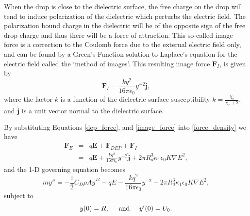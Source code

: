 \documentclass[12pt,a4paper,oneside]{book}
\begin{document}
When the drop is close to the dielectric surface, the free charge on the drop will tend to induce polarization of the dielectric which perturbs the electric field. The polarization bound charge in the dielectric will be of the opposite sign of the free drop charge and thus there will be a force of attraction. This so-called image force is a correction to the Coulomb force due to the external electric field only, and can be found by a Green's Function solution to Laplace's equation for the electric field called the `method of images'\cite{david_j._griffiths_introduction_1999}. This resulting image force $\mathbf{F}_I$, is given by
\begin{equation}
\mathbf{F}_I = \frac{k q^2}{16 \pi \epsilon_0} y^{-2} \hat{\mathbf{j}},
\label{image_force}
\end{equation}
where the factor $k$ is a function of the dielectric surface susceptibility $k = \frac{\chi_e}{\chi_e + 2}$, and $\hat{\mathbf{j}}$ is a unit vector normal to the dielectric surface.

By substituting Equations \ref{dep_force}, and \ref{image_force} into \ref{force_density} we have
\begin{eqnarray*}
 \mathbf{F}_E &=& q \mathbf{E} + \mathbf{F}_{DEP} + \mathbf{F}_I \\
 &=& q \mathbf{E} + \frac{k q^2}{16 \pi \epsilon_0 } y^{-2} \hat{\mathbf{j}} + 2 \pi R_d^3 \kappa_1 \epsilon_0 K \nabla E^2, 
\end{eqnarray*}
and the 1-D governing equation becomes
\begin{equation}
 \label{gov_eqn_subs}
m y'' = - \frac{1}{2} C_D \rho A {y'}^2 - q E - \frac{k q^2}{16 \pi \epsilon_0} y^{-2}- 2 \pi R_d^3 \kappa_1 \epsilon_0 K \nabla E^2,
\end{equation}
subject to
\begin{equation}
y(0) = R, \hspace{5 mm} \mbox{and} \hspace{5 mm} y'(0) = U_0 .
\end{equation}
\end{document}
